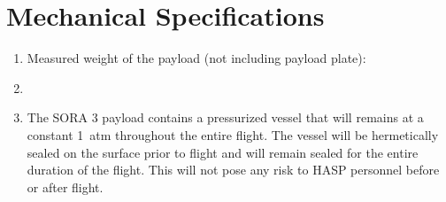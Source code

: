 \newpage
\section{Mechanical Specifications}
\label{sec:Mechanical}

\hspace*{0.5cm}
\begin{minipage}{\linewidth-0.5cm}
  \begin{enumerate}[label=\Alph*.]
  \item Measured weight of the payload (not including payload plate): \newline
  \item %
  \item The SORA 3 payload contains a pressurized vessel that will remains at a constant \SI{1}{atm} throughout the entire flight. The vessel will be hermetically sealed on the surface prior to flight and will remain sealed for the entire duration of the flight. This will not pose any risk to HASP personnel before or after flight.
  \end{enumerate}
\end{minipage}

\hspace{1cm}

